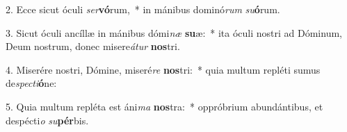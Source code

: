 2. Ecce sicut óculi \textit{ser}\textbf{vó}rum,~*  in mánibus dominó\textit{rum} \textit{su}\textbf{ó}rum.\

3. Sicut óculi ancíllæ in mánibus dómi\textit{næ} \textbf{su}æ:~*  ita óculi nostri ad Dóminum, Deum nostrum, donec misere\textit{á}\textit{tur} \textbf{nos}tri.\

4. Miserére nostri, Dómine, miseré\textit{re} \textbf{nos}tri:~*  quia multum repléti sumus de\textit{spec}\textit{ti}\textbf{ó}ne:\

5. Quia multum repléta est áni\textit{ma} \textbf{nos}tra:~*  oppróbrium abundántibus, et despécti\textit{o} \textit{su}\textbf{pér}bis.\

